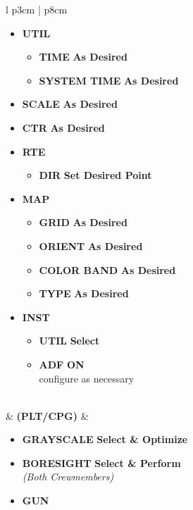 \documentclass[fontHelvetica]{TechCheck}
\begin{document}
\begin{center}
\begin{longtable}{l p{3cm} | p{8cm}}
\begin{minipage}[t]{\linewidth}
\begin{itemize}
					\item \textbf{UTIL}
					\begin{itemize}
						\item \textbf{TIME} \dotfill \textbf{As Desired}
						\item \textbf{SYSTEM TIME} \dotfill \textbf{As Desired}
					\end{itemize}
					\item \textbf{SCALE} \dotfill \textbf{As Desired}
					\item \textbf{CTR} \dotfill \textbf{As Desired}
					\item \textbf{RTE}
					\begin{itemize}
						\item \textbf{DIR} \dotfill \textbf{Set Desired Point}
					\end{itemize}
					\item \textbf{MAP}
					\begin{itemize}
						\item \textbf{GRID} \dotfill \textbf{As Desired}
						\item \textbf{ORIENT} \dotfill \textbf{As Desired}
						\item \textbf{COLOR BAND} \dotfill \textbf{As Desired}
						\item \textbf{TYPE} \dotfill \textbf{As Desired}
					\end{itemize}
					\item \textbf{INST}
					\begin{itemize}
						\item \textbf{UTIL} \dotfill \textbf{Select}
						\item \textbf{ADF} \dotfill \textbf{ON} \\
						\hfill configure as necessary
					\end{itemize}
				\end{itemize}
			\end{minipage} \\
			\midrule
			\textbf{\textbullet} &  \textbf{(PLT/CPG)} &
			\begin{minipage}[t]{\linewidth}
				\vspace{-7pt}
				\begin{itemize}
					\item \textbf{GRAYSCALE} \dotfill \textbf{Select \& Optimize}
					\item \textbf{BORESIGHT} \dotfill \textbf{Select \& Perform} \\
					\hfill \emph{(Both Crewmembers)}
					\item \textbf{GUN}

\end{itemize}
\end{minipage}
\end{longtable}
\end{center}
\end{document}

